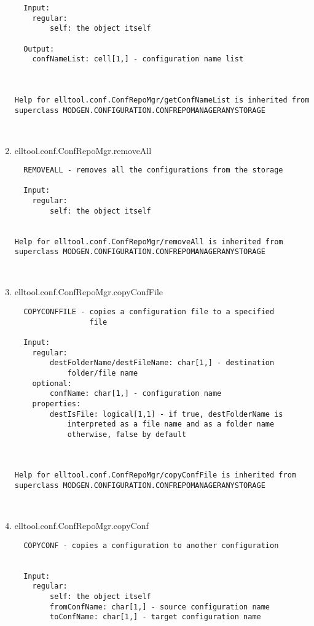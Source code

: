 \begin{enumerate}
\begin{lstlisting}
  Input:
    regular:
        self: the object itself

  Output:
    confNameList: cell[1,] - configuration name list



Help for elltool.conf.ConfRepoMgr/getConfNameList is inherited from superclass MODGEN.CONFIGURATION.CONFREPOMANAGERANYSTORAGE



\end{lstlisting}
\fontfamily{\familydefault}
\selectfont
\item {elltool.conf.ConfRepoMgr.removeAll}
\selectfont
\begin{lstlisting}
  REMOVEALL - removes all the configurations from the storage

  Input:
    regular:
        self: the object itself


Help for elltool.conf.ConfRepoMgr/removeAll is inherited from superclass MODGEN.CONFIGURATION.CONFREPOMANAGERANYSTORAGE



\end{lstlisting}
\fontfamily{\familydefault}
\selectfont
\item {elltool.conf.ConfRepoMgr.copyConfFile}
\selectfont
\begin{lstlisting}
  COPYCONFFILE - copies a configuration file to a specified
                 file

  Input:
    regular:
        destFolderName/destFileName: char[1,] - destination
            folder/file name
    optional:
        confName: char[1,] - configuration name
    properties:
        destIsFile: logical[1,1] - if true, destFolderName is
            interpreted as a file name and as a folder name
            otherwise, false by default



Help for elltool.conf.ConfRepoMgr/copyConfFile is inherited from superclass MODGEN.CONFIGURATION.CONFREPOMANAGERANYSTORAGE



\end{lstlisting}
\fontfamily{\familydefault}
\selectfont
\item {elltool.conf.ConfRepoMgr.copyConf}
\selectfont
\begin{lstlisting}
  COPYCONF - copies a configuration to another configuration


  Input:
    regular:
        self: the object itself
        fromConfName: char[1,] - source configuration name
        toConfName: char[1,] - target configuration name




\end{lstlisting}
\end{enumerate}
